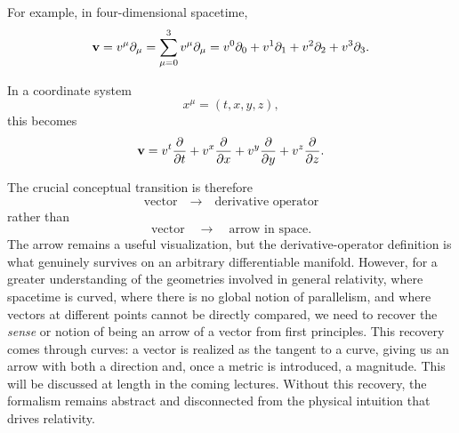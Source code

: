		For example, in four-dimensional spacetime,
		\begin{equation}
			\vb{v}
			=
			v^\mu\partial_\mu
			=
			\sum_{\mu=0}^{3} 
			v^\mu\partial_\mu
			=
			v^0\partial_0
			+
			v^1\partial_1
			+
			v^2\partial_2
			+
			v^3\partial_3.
			\label{eq:four-vector-expansion}
		\end{equation}

		In a coordinate system
		\[
			x^\mu=(t,x,y,z),
		\]
		this becomes
		\begin{equation}
			\vb{v}
			=
			v^t\pdv{}{t}
			+
			v^x\pdv{}{x}
			+
			v^y\pdv{}{y}
			+
			v^z\pdv{}{z}.
			\label{eq:spacetime-vector-expansion}
		\end{equation}

		The crucial conceptual transition is therefore
		\begin{equation}
			\boxed{
				\text{vector}
				\quad\longrightarrow\quad
				\text{derivative operator}
			}
			\label{eq:vector-as-derivative}
		\end{equation}
		rather than
		\[
			\text{vector}
			\quad\longrightarrow\quad
			\text{arrow in space}.
		\]
		The arrow remains a useful visualization, but the derivative-operator definition 
		is what genuinely survives on an arbitrary differentiable manifold. However, for 
		a greater understanding of the geometries involved in general relativity, where 
		spacetime is curved, where there is no global notion of parallelism, and where 
		vectors at different points cannot be directly compared, we need to recover the
		\textit{sense} or notion of being an arrow of a vector from first principles. 
		This recovery comes through curves: a vector is realized as the tangent to a curve,
		giving us an arrow with both a direction and, once a metric is introduced, a magnitude. 
		This will be discussed at length in the coming lectures. 
		Without this recovery, the formalism remains abstract and disconnected from the physical
		intuition that drives relativity.
